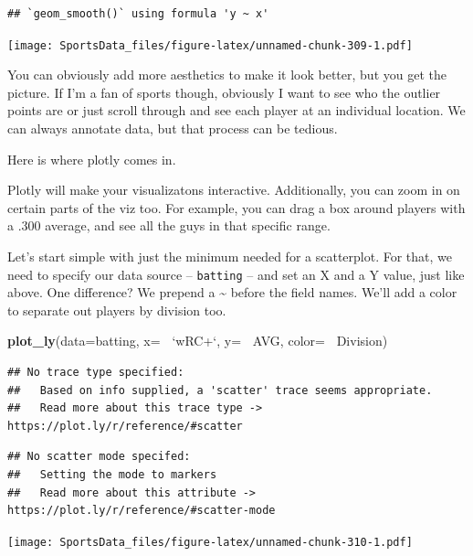 \documentclass[
]{book}
\newenvironment{Shaded}{\begin{snugshade}}{\end{snugshade}}
\newcommand{\DataTypeTok}[1]{\textcolor[rgb]{0.13,0.29,0.53}{#1}}
\newcommand{\KeywordTok}[1]{\textcolor[rgb]{0.13,0.29,0.53}{\textbf{#1}}}
\newcommand{\NormalTok}[1]{#1}
\newcommand{\OperatorTok}[1]{\textcolor[rgb]{0.81,0.36,0.00}{\textbf{#1}}}
\newcommand{\StringTok}[1]{\textcolor[rgb]{0.31,0.60,0.02}{#1}}
\begin{document}
\begin{verbatim}
## `geom_smooth()` using formula 'y ~ x'
\end{verbatim}

\texttt{[image: SportsData\_files/figure-latex/unnamed-chunk-309-1.pdf]}

You can obviously add more aesthetics to make it look better, but you get the picture. If I'm a fan of sports though, obviously I want to see who the outlier points are or just scroll through and see each player at an individual location. We can always annotate data, but that process can be tedious.

Here is where plotly comes in.

Plotly will make your visualizatons interactive. Additionally, you can zoom in on certain parts of the viz too. For example, you can drag a box around players with a .300 average, and see all the guys in that specific range.

Let's start simple with just the minimum needed for a scatterplot. For that, we need to specify our data source -- \texttt{batting} -- and set an X and a Y value, just like above. One difference? We prepend a \textasciitilde{} before the field names. We'll add a color to separate out players by division too.

\begin{Shaded}
\begin{Highlighting}[]
\KeywordTok{plot_ly}\NormalTok{(}\DataTypeTok{data=}\NormalTok{batting, }\DataTypeTok{x=} \OperatorTok{~}\StringTok{`}\DataTypeTok{wRC+}\StringTok{`}\NormalTok{, }\DataTypeTok{y=} \OperatorTok{~}\NormalTok{AVG, }\DataTypeTok{color=} \OperatorTok{~}\NormalTok{Division)}
\end{Highlighting}
\end{Shaded}

\begin{verbatim}
## No trace type specified:
##   Based on info supplied, a 'scatter' trace seems appropriate.
##   Read more about this trace type -> https://plot.ly/r/reference/#scatter
\end{verbatim}

\begin{verbatim}
## No scatter mode specifed:
##   Setting the mode to markers
##   Read more about this attribute -> https://plot.ly/r/reference/#scatter-mode
\end{verbatim}

\texttt{[image: SportsData\_files/figure-latex/unnamed-chunk-310-1.pdf]}
\end{document}
